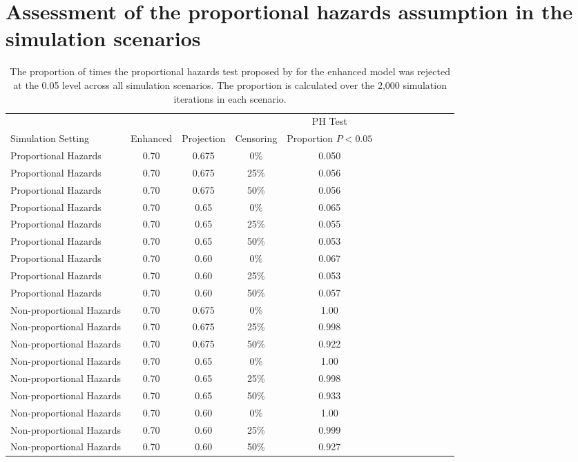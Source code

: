 \documentclass[12pt]{article}
\begin{document}
\newpage

	
	 \section{Assessment of the proportional hazards assumption in the simulation scenarios}
 
 \begin{table}[ht]
 \caption{The proportion of times the proportional hazards test proposed by \cite{Grambsch1994} for the enhanced model was rejected at the 0.05 level across all simulation scenarios. The proportion is calculated over the 2,000 simulation iterations in each scenario. }
\centering
\small
\begin{tabular}{lcccccccccccc} \label{simPHtest}
 \vspace{-0.25cm}
 &&&& PH Test& \\
Simulation Setting & Enhanced &  Projection  & Censoring & Proportion $P < 0.05$\\
 \hline
  \hline
 Proportional Hazards &0.70 & 0.675  & 0\% & 0.050 \\ 
Proportional Hazards  &0.70 & 0.675  &25\% &  0.056 \\ 
Proportional Hazards  &0.70 & 0.675  &50\%  & 0.056 \\ 
  \hline
Proportional Hazards &0.70 & 0.65  & 0\% & 0.065 \\ 
Proportional Hazards  &0.70 & 0.65  &25\% & 0.055 \\ 
Proportional Hazards  &0.70 & 0.65  &50\%  & 0.053 \\ 
 \hline
Proportional Hazards  &0.70 & 0.60  & 0\% & 0.067 \\ 
Proportional Hazards  &0.70 & 0.60   &25\% & 0.053  \\ 
Proportional Hazards  &0.70 & 0.60   &50\%  & 0.057 \\ 
  \hline
     \hline
Non-proportional Hazards &0.70 & 0.675  & 0\% & 1.00 \\ 
Non-proportional Hazards  &0.70 & 0.675  &25\% & 0.998  \\ 
Non-proportional Hazards  &0.70 & 0.675 &50\%  & 0.922   \\ 
   \hline
Non-proportional Hazards &0.70 & 0.65  & 0\% & 1.00 \\ 
Non-proportional Hazards  &0.70 & 0.65  &25\% & 0.998  \\ 
Non-proportional Hazards  &0.70 & 0.65 &50\%  &  0.933 \\ 
 \hline
Non-proportional Hazards  &0.70 & 0.60  & 0\% & 1.00\\ 
Non-proportional Hazards  &0.70 & 0.60   &25\% &  0.999\\ 
Non-proportional Hazards  &0.70 & 0.60   &50\%  & 0.927\\ 
  \hline
  \hline
\end{tabular}
\end{table}

 
\end{document}
